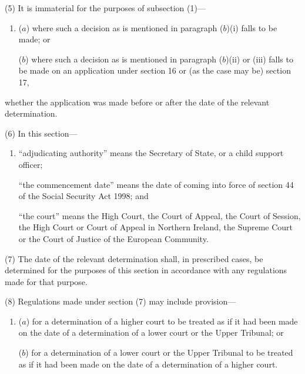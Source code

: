 \documentclass[a4paper]{article}
\begin{document}
(5) It is immaterial for the purposes of subsection (1)---
\begin{enumerate}\item[]
($a$) where such a decision as is mentioned in paragraph ($b$)(i) falls to be made; or

($b$) where such a decision as is mentioned in paragraph ($b$)(ii) or (iii) falls to be made on an application under section 16 or (as the case may be) section 17,
\end{enumerate}
whether the application was made before or after the date of the relevant determination.

(6) In this section---
\begin{enumerate}\item[]
 “adjudicating authority” means the Secretary of State, or a child support officer; 

“the commencement date” means the date of coming into force of section 44 of the Social Security Act 1998; and 

“the court” means the High Court, the Court of Appeal, the Court of Session, the High Court or Court of Appeal in Northern Ireland, the Supreme Court or the Court of Justice of the European Community.
\end{enumerate}

(7) The date of the relevant determination shall, in prescribed cases, be determined for the purposes of this section in accordance with any regulations made for that purpose.

(8) Regulations made under section (7) may include provision---
\begin{enumerate}\item[]
($a$) for a determination of a higher court to be treated as if it had been made on the date of a determination of a lower court or the Upper Tribunal; or

($b$) for a determination of a lower court or the Upper Tribunal to be treated as if it had been made on the date of a determination of a higher court.
\end{enumerate}
\end{document}
